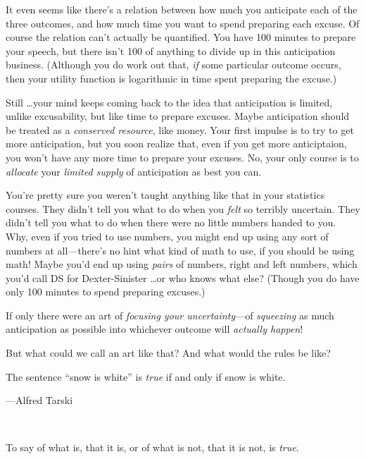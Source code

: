 {
 It even seems like there's a relation between how
much you anticipate each of the three outcomes, and how much time you
want to spend preparing each excuse. Of course the relation
can't actually be quantified. You have 100 minutes to
prepare your speech, but there isn't 100 of anything to
divide up in this anticipation business. (Although you do work out
that, \textit{if} some particular outcome occurs, then your utility
function is logarithmic in time spent preparing the excuse.)}

{
 Still \ldots your mind keeps coming back to the idea that
anticipation is limited, unlike excusability, but like time to prepare
excuses. Maybe anticipation should be treated as a \textit{conserved
resource}, like money. Your first impulse is to try to get more
anticipation, but you soon realize that, even if you get more
anticiptaion, you won't have any more time to prepare
your excuses. No, your only course is to \textit{allocate} your
\textit{limited supply} of anticipation as best you can.}

{
 You're pretty sure you weren't
taught anything like that in your statistics courses. They
didn't tell you what to do when you \textit{felt} so
terribly uncertain. They didn't tell you what to do
when there were no little numbers handed to you. Why, even if you tried
to use numbers, you might end up using any sort of numbers at
all---there's no hint what kind of math to use, if you
should be using math! Maybe you'd end up using
\textit{pairs} of numbers, right and left numbers, which
you'd call DS for Dexter-Sinister \ldots or who knows
what else? (Though you do have only 100 minutes to spend preparing
excuses.)}

{
 If only there were an art of \textit{focusing your
uncertainty}{}---of \textit{squeezing} as much anticipation as possible
into whichever outcome will \textit{actually happen}!}

{
 But what could we call an art like that? And what would the rules
be like?}

\myendsectiontext


{
 The sentence ``snow is white''
is \textit{true} if and only if snow is white.}

{\raggedleft
 {}---Alfred Tarski
\par}


\bigskip

{
 ~}

{
 To say of what is, that it is, or of what is not, that it is not,
is \textit{true}.}

